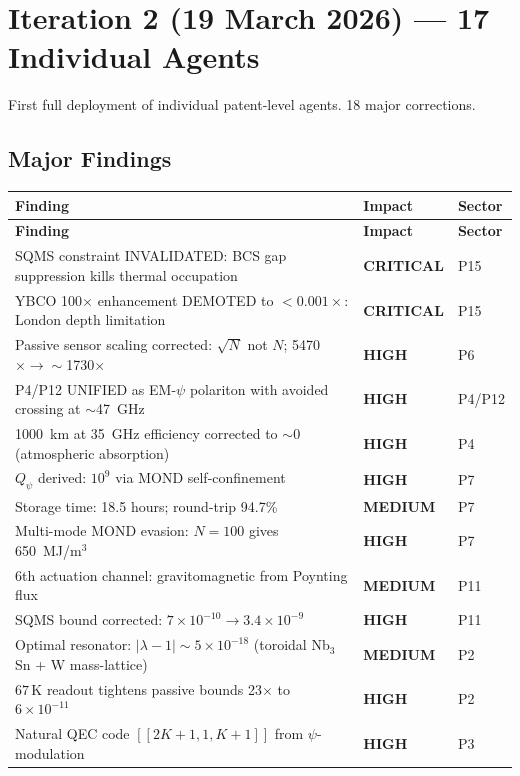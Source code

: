 \documentclass[11pt,a4paper]{article}
\newcommand{\CRITICAL}{\textcolor{critical}{\textbf{CRITICAL}}}
\newcommand{\HIGH}{\textcolor{high}{\textbf{HIGH}}}
\newcommand{\MEDIUM}{\textcolor{medium}{\textbf{MEDIUM}}}
\begin{document}
\section{Iteration 2 (19 March 2026) --- 17 Individual Agents}

First full deployment of individual patent-level agents.  18 major corrections.

\subsection{Major Findings}

\begin{longtable}{p{}p{}p{}}
\toprule
\textbf{Finding} & \textbf{Impact} & \textbf{Sector} \\
\midrule
\endfirsthead
\midrule
\textbf{Finding} & \textbf{Impact} & \textbf{Sector} \\
\midrule
\endhead
SQMS constraint INVALIDATED: BCS gap suppression kills thermal occupation & \CRITICAL & P15 \\
YBCO 100$\times$ enhancement DEMOTED to $<0.001\times$: London depth limitation & \CRITICAL & P15 \\
Passive sensor scaling corrected: $\sqrt{N}$ not $N$; 5470$\times \to \sim$1730$\times$ & \HIGH & P6 \\
P4/P12 UNIFIED as EM-$\psi$ polariton with avoided crossing at $\sim$47~GHz & \HIGH & P4/P12 \\
1000~km at 35~GHz efficiency corrected to $\sim$0 (atmospheric absorption) & \HIGH & P4 \\
$Q_\psi$ derived: $10^9$ via MOND self-confinement & \HIGH & P7 \\
Storage time: 18.5 hours; round-trip 94.7\% & \MEDIUM & P7 \\
Multi-mode MOND evasion: $N=100$ gives 650~MJ/m$^3$ & \HIGH & P7 \\
6th actuation channel: gravitomagnetic from Poynting flux & \MEDIUM & P11 \\
SQMS bound corrected: $7\times10^{-10} \to 3.4\times10^{-9}$ & \HIGH & P11 \\
Optimal resonator: $|\lambda-1|\sim 5\times10^{-18}$ (toroidal Nb$_3$Sn + W mass-lattice) & \MEDIUM & P2 \\
$67\,$K readout tightens passive bounds 23$\times$ to $6\times10^{-11}$ & \HIGH & P2 \\
Natural QEC code $[[2K+1,1,K+1]]$ from $\psi$-modulation & \HIGH & P3 \\

\end{longtable}
\end{document}
